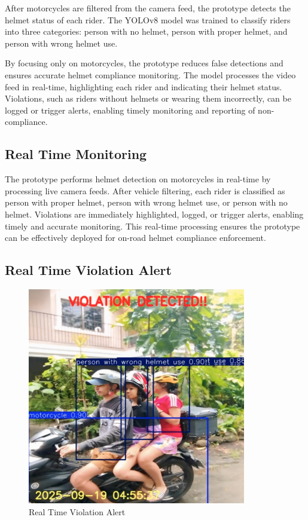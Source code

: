 \begin{refsection}
\noindent
After motorcycles are filtered from the camera feed, the prototype detects the helmet status of each rider. The YOLOv8 model was trained to classify riders into three categories: person with no helmet, person with proper helmet, and person with wrong helmet use.


By focusing only on motorcycles, the prototype reduces false detections and ensures accurate helmet compliance monitoring. The model processes the video feed in real-time, highlighting each rider and indicating their helmet status. Violations, such as riders without helmets or wearing them incorrectly, can be logged or trigger alerts, enabling timely monitoring and reporting of non-compliance.

\subsection{Real Time Monitoring}

The prototype performs helmet detection on motorcycles in real-time by processing live camera feeds. After vehicle filtering, each rider is classified as person with proper helmet, person with wrong helmet use, or person with no helmet. Violations are immediately highlighted, logged, or trigger alerts, enabling timely and accurate monitoring. This real-time processing ensures the prototype can be effectively deployed for on-road helmet compliance enforcement.

\subsection{Real Time Violation Alert}

\begin{figure}[ht]
    \centering
	\includegraphics[width=0.85\textwidth]{figures/Fig 21.jpg}
	\caption[Real Time Violation Alert]{Real Time Violation Alert}
	\label{fig:real_time_violation_alert}
\end{figure}


\end{refsection}
